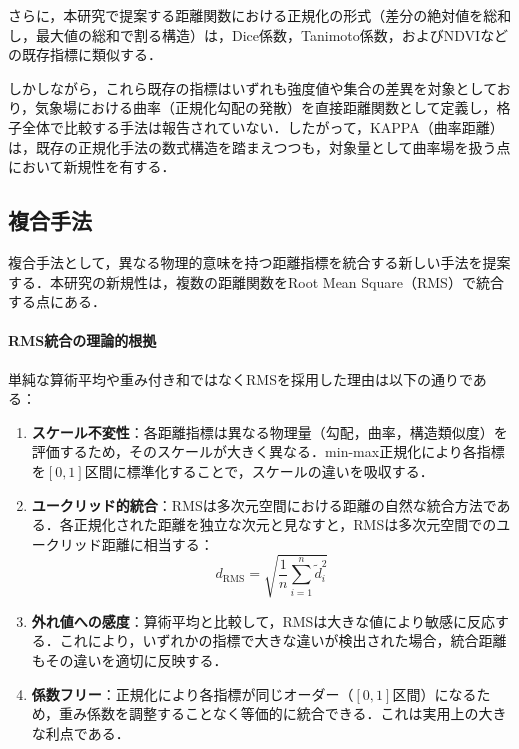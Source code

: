 \documentclass{jarticle}
\theoremstyle{definition}
\begin{document}
さらに，本研究で提案する距離関数における正規化の形式（差分の絶対値を総和し，最大値の総和で割る構造）は，Dice係数\cite{dice1945measures}，Tanimoto係数\cite{tanimoto1957elementary}，およびNDVI\cite{rouse1974monitoring}などの既存指標に類似する．

しかしながら，これら既存の指標はいずれも強度値や集合の差異を対象としており，気象場における曲率（正規化勾配の発散）を直接距離関数として定義し，格子全体で比較する手法は報告されていない．したがって，KAPPA（曲率距離）は，既存の正規化手法の数式構造を踏まえつつも，対象量として曲率場を扱う点において新規性を有する．

\subsection{複合手法}
複合手法として，異なる物理的意味を持つ距離指標を統合する新しい手法を提案する．本研究の新規性は，複数の距離関数をRoot Mean Square（RMS）で統合する点にある．

\paragraph{RMS統合の理論的根拠}
単純な算術平均や重み付き和ではなくRMSを採用した理由は以下の通りである：

\begin{enumerate}
\item \textbf{スケール不変性}：各距離指標は異なる物理量（勾配，曲率，構造類似度）を評価するため，そのスケールが大きく異なる．min-max正規化により各指標を$[0,1]$区間に標準化することで，スケールの違いを吸収する．

\item \textbf{ユークリッド的統合}：RMSは多次元空間における距離の自然な統合方法である．各正規化された距離を独立な次元と見なすと，RMSは多次元空間でのユークリッド距離に相当する：
\begin{equation}
d_{\text{RMS}} = \sqrt{\frac{1}{n}\sum_{i=1}^{n} \tilde{d}_i^2}
\end{equation}

\item \textbf{外れ値への感度}：算術平均と比較して，RMSは大きな値により敏感に反応する．これにより，いずれかの指標で大きな違いが検出された場合，統合距離もその違いを適切に反映する．

\item \textbf{係数フリー}：正規化により各指標が同じオーダー（$[0,1]$区間）になるため，重み係数を調整することなく等価的に統合できる．これは実用上の大きな利点である．
\end{enumerate}
\end{document}
